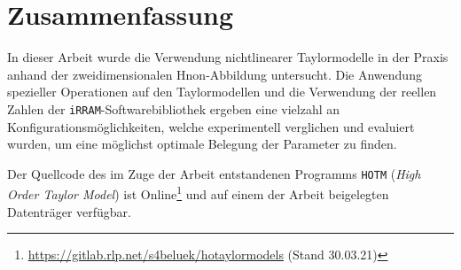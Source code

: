 \chapter*{Zusammenfassung}
In dieser Arbeit wurde die Verwendung nichtlinearer Taylormodelle in der Praxis anhand der zweidimensionalen H\e non-Abbildung untersucht. Die Anwendung spezieller Operationen auf den Taylormodellen und die Verwendung der reellen Zahlen der \verb+iRRAM+-Softwarebibliothek ergeben eine vielzahl an Konfigurationsmöglichkeiten, welche experimentell verglichen und evaluiert wurden, um eine möglichst optimale Belegung der Parameter zu finden.

Der Quellcode des im Zuge der Arbeit entstandenen Programms \verb+HOTM+ (\textit{High Order Taylor Model}) ist Online\footnote{\url{https://gitlab.rlp.net/s4beluek/hotaylormodels} (Stand 30.03.21)} und auf einem der Arbeit beigelegten Datenträger verfügbar.

